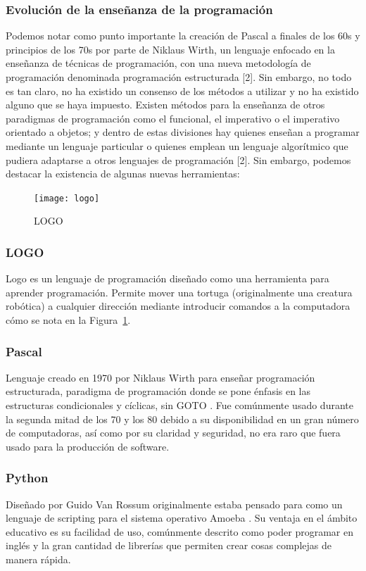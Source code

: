 \subsubsection{Evolución de la enseñanza de la programación}
Podemos notar como punto importante la creación de Pascal a finales de los 60s y principios de los 70s por parte de Niklaus Wirth, un lenguaje enfocado en la enseñanza de técnicas de programación, con una nueva metodología de programación denominada programación estructurada [2]. Sin embargo, no todo es tan claro, no ha existido un consenso de los métodos a utilizar y no ha existido alguno que se haya impuesto. 
Existen métodos para la enseñanza de otros paradigmas de programación como el funcional, el imperativo o el imperativo orientado a objetos; y dentro de estas divisiones hay quienes enseñan a programar mediante un lenguaje particular o quienes emplean un lenguaje algorítmico que pudiera adaptarse a otros lenguajes de programación [2].
Sin embargo, podemos destacar la existencia de algunas nuevas herramientas:

\begin{figure}[h]
  
    \centering
    \texttt{[image: logo]}
     \caption{LOGO}
    \label{fig:logo_scrn}
\end{figure}

\subsubsection{LOGO}
Logo es un lenguaje de programación diseñado como una herramienta para aprender programación. 
Permite mover una tortuga (originalmente una creatura robótica) a cualquier dirección 
mediante introducir comandos a la computadora \cite{logo_history} cómo se nota en la Figura~\ref{fig:logo_scrn}.

\subsubsection{Pascal}
Lenguaje creado en 1970 por Niklaus Wirth para enseñar programación estructurada, 
paradigma de programación donde se pone énfasis en las 
estructuras condicionales y cíclicas, sin GOTO \cite{pascal_history}. 
Fue comúnmente usado durante la segunda mitad de los 70 y los 80 
debido a su disponibilidad en un gran número de computadoras, 
así como por su claridad y seguridad, no era raro que fuera usado para la 
producción de software.

\subsubsection{Python}
Diseñado por Guido Van Rossum originalmente estaba pensado 
para como un lenguaje de scripting para el sistema operativo Amoeba \cite{python_history}. 
Su ventaja en el ámbito educativo es su facilidad de uso, comúnmente descrito 
como poder programar en inglés y la gran cantidad de librerías que permiten 
crear cosas complejas de manera rápida.

